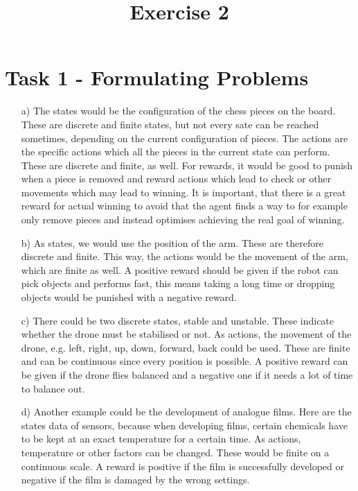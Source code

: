 \documentclass[a4paper]{article}
\date{}
\author{}
\title{\textbf{Exercise 2}}
\begin{document}
\maketitle 
\thispagestyle{fancy}

\section*{Task 1 - Formulating Problems}

\begin{enumerate}
	\item[a)] 
	The states would be the configuration of the chess pieces on the board. 
	These are discrete and finite states, but not every sate can be reached sometimes, depending on the current configuration of pieces.
	The actions are the specific actions which all the pieces in the current state can perform. 
	These are discrete and finite, as well. 
	For rewards, it would be good to punish when a piece is removed and reward actions which lead to check or other movements which may lead to winning.
	It is important, that there is a great reward for actual winning to avoid that the agent finds a way to for example only remove pieces and instead optimises achieving the real goal of winning. 
	\item[b)] 
	As states, we would use the position of the arm. 
	These are therefore discrete and finite.
	This way, the actions would be the movement of the arm, which are finite as well. 
	A positive reward should be given if the robot can pick objects and performs fast, this means taking a long time or dropping objects would be punished with a negative reward. 
	\item[c)] 
	There could be two discrete states, stable and unstable. 
	These indicate whether the drone must be stabilised or not. 
	As actions, the movement of the drone, e.g. left, right, up, down, forward, back could be used. 
	These are finite and can be continuous since every position is possible. 
	A positive reward can be given if the drone flies balanced and a negative one if it needs a lot of time to balance out. 
	\item[d)] 
	Another example could be the development of analogue films. 
	Here are the states data of sensors, because when developing films, certain chemicals have to be kept at an exact temperature for a certain time. 
	As actions, temperature or other factors can be changed. 
	These would be finite on a continuous scale. 
	A reward is positive if the film is successfully developed or negative if the film is damaged by the wrong settings. 
	
\end{enumerate}
\end{document}

